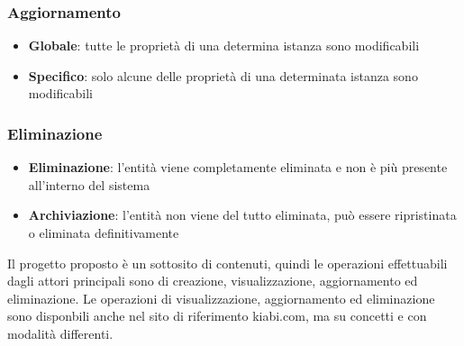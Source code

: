 \documentclass[12pt,italian,]{report}
\providecommand{\tightlist}{%
  \setlength{\itemsep}{0pt}\setlength{\parskip}{0pt}}
\begin{document}
\hypertarget{aggiornamento}{%
\subsubsection{Aggiornamento}\label{aggiornamento}}

\begin{itemize}
\tightlist
\item
  \textbf{Globale}: tutte le proprietà di una determina istanza sono
  modificabili
\item
  \textbf{Specifico}: solo alcune delle proprietà di una determinata
  istanza sono modificabili
\end{itemize}

\hypertarget{eliminazione}{%
\subsubsection{Eliminazione}\label{eliminazione}}

\begin{itemize}
\tightlist
\item
  \textbf{Eliminazione}: l'entità viene completamente eliminata e non è
  più presente all'interno del sistema
\item
  \textbf{Archiviazione}: l'entità non viene del tutto eliminata, può
  essere ripristinata o eliminata definitivamente
\end{itemize}

Il progetto proposto è un sottosito di contenuti, quindi le operazioni effettuabili dagli attori principali sono di creazione, visualizzazione, aggiornamento ed eliminazione. Le operazioni di visualizzazione, aggiornamento ed eliminazione sono disponbili anche nel sito di riferimento kiabi.com, ma su concetti e con modalità differenti.
\end{document}

